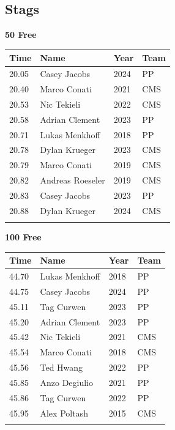 \subsection{Stags}
\vspace{1.2em}
\noindent\begin{minipage}[t]{0.98\textwidth}
\centering
\textbf{\textcolor{teamprimary}{50 Free}}\par
\vspace{0.5em}
\centering
\small
\renewcommand{\arraystretch}{1.0}
\setlength{\tabcolsep}{4pt}
\begin{tabular}{@{}p{2.5cm}p{4.5cm}p{1.5cm}p{2.5cm}@{}}
\toprule
\textbf{Time} & \textbf{Name} & \textbf{Year} & \textbf{Team} \\
\midrule
20.05 & Casey Jacobs & 2024 & PP \\
20.40 & Marco Conati & 2021 & CMS \\
20.53 & Nic Tekieli & 2022 & CMS \\
20.58 & Adrian Clement & 2023 & PP \\
20.71 & Lukas Menkhoff & 2018 & PP \\
20.78 & Dylan Krueger & 2023 & CMS \\
20.79 & Marco Conati & 2019 & CMS \\
20.82 & Andreas Roeseler & 2019 & CMS \\
20.83 & Casey Jacobs & 2023 & PP \\
20.88 & Dylan Krueger & 2024 & CMS \\
\bottomrule
\vspace{0.5em}
\end{tabular}
\end{minipage}
\vspace{1.2em}
\noindent\begin{minipage}[t]{0.98\textwidth}
\centering
\textbf{\textcolor{teamprimary}{100 Free}}\par
\vspace{0.5em}
\centering
\small
\renewcommand{\arraystretch}{1.0}
\setlength{\tabcolsep}{4pt}
\begin{tabular}{@{}p{2.5cm}p{4.5cm}p{1.5cm}p{2.5cm}@{}}
\toprule
\textbf{Time} & \textbf{Name} & \textbf{Year} & \textbf{Team} \\
\midrule
44.70 & Lukas Menkhoff & 2018 & PP \\
44.75 & Casey Jacobs & 2024 & PP \\
45.11 & Tag Curwen & 2023 & PP \\
45.20 & Adrian Clement & 2023 & PP \\
45.42 & Nic Tekieli & 2021 & CMS \\
45.54 & Marco Conati & 2018 & CMS \\
45.56 & Ted Hwang & 2022 & PP \\
45.85 & Anzo Degiulio & 2021 & PP \\
45.86 & Tag Curwen & 2022 & PP \\
45.95 & Alex Poltash & 2015 & CMS \\
\bottomrule
\vspace{0.5em}
\end{tabular}
\end{minipage}
